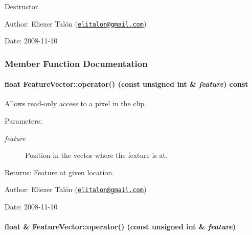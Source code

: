 Destructor. 

\begin{Desc}
\item[Author:]Eliezer Talón (\href{mailto:elitalon@gmail.com}{\tt elitalon@gmail.com}) \end{Desc}
\begin{Desc}
\item[Date:]2008-11-10 \end{Desc}


\subsubsection{Member Function Documentation}
\hypertarget{class_feature_vector_e5d3e313cc1080b4e17526ea938d8a74}{
\paragraph[{operator()}]{\setlength{\rightskip}{0pt plus 5cm}float FeatureVector::operator() (const unsigned int \& {\em feature}) const}\hfill}
\label{class_feature_vector_e5d3e313cc1080b4e17526ea938d8a74}


Allows read-only access to a pixel in the clip. 

\begin{Desc}
\item[Parameters:]
\begin{description}
\item[{\em feature}]Position in the vector where the feature is at.\end{description}
\end{Desc}
\begin{Desc}
\item[Returns:]Feature at given location.\end{Desc}
\begin{Desc}
\item[Author:]Eliezer Talón (\href{mailto:elitalon@gmail.com}{\tt elitalon@gmail.com}) \end{Desc}
\begin{Desc}
\item[Date:]2008-11-10 \end{Desc}
\hypertarget{class_feature_vector_40786ed7bca879e6f4dea8a396dccedf}{
\paragraph[{operator()}]{\setlength{\rightskip}{0pt plus 5cm}float \& FeatureVector::operator() (const unsigned int \& {\em feature})}\hfill}
\label{class_feature_vector_40786ed7bca879e6f4dea8a396dccedf}


